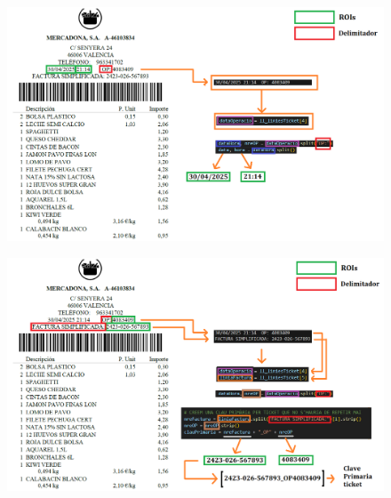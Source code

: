 \documentclass{beamer}
\begin{document}
		\begin{frame}
			\begin{figure}
				\centering
				\includegraphics[width=1\linewidth]{imgEspecifiques/ticketExtraccioJ.png}
				\label{fig:ticketExtraccioJ}
			\end{figure}
		\end{frame}
		
		\begin{frame}
			\begin{figure}
				\centering
				\includegraphics[width=1\linewidth]{imgEspecifiques/ticketExtraccioK.png}
				\label{fig:ticketExtraccioK}
			\end{figure}
		\end{frame}
			
	
			
\end{document}
